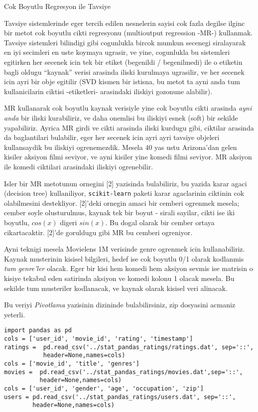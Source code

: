 \documentclass[12pt,fleqn]{article}\usepackage{../common}
\begin{document}
Cok Boyutlu Regresyon ile Tavsiye

Tavsiye sistemlerinde eger tercih edilen nesnelerin sayisi cok fazla
degilse ilginc bir metot cok boyutlu cikti regresyonu (multioutput
regression -MR-) kullanmak. Tavsiye sistemleri bilindigi gibi cogunlukla
bircok mumkun secenegi siralayarak en iyi secimleri en uste koymaya
ugrasir, ve yine, cogunlukla bu sistemleri egitirken her secenek icin tek
bir etiket (begenildi / begenilmedi) ile o etiketin bagli oldugu ``kaynak''
verisi arasinda iliski kurulmaya ugrasilir, ve her secenek icin ayri bir
obje egitilir (SVD kismen bir istisna, bu metot ta ayni anda tum
kullanicilarin ciktisi -etiketleri- arasindaki iliskiyi gozonune alabilir).

MR kullanarak cok boyutlu kaynak verisiyle yine cok boyutlu cikti arasinda
{\em ayni anda} bir iliski kurabiliriz, ve daha onemlisi bu iliskiyi esnek
(soft) bir sekilde yapabiliriz. Ayrica MR girdi ve cikti arasinda iliski
kurdugu gibi, ciktilar arasinda da baglantilari bulabilir, eger her secenek
icin ayri ayri tavsiye objeleri kullansaydik bu iliskiyi
ogrenemezdik. Mesela 40 yas ustu Arizona'dan gelen kisiler aksiyon filmi
seviyor, ve ayni kisiler yine komedi filmi seviyor. MR aksiyon ile komedi
ciktilari arasindaki iliskiyi ogrenebilir.

Isler bir MR metotunun ornegini [2] yazisinda bulabiliriz, bu yazida karar
agaci (decision tree) kullaniliyor, \verb!scikit-learn! paketi karar
agaclarinin ciktinin cok olabilmesini destekliyor. [2]'deki ornegin amaci
bir cemberi ogrenmek mesela; cember soyle olusturulmus, kaynak tek bir
boyut - sirali sayilar, cikti ise iki boyutlu, $cos(x)$ digeri $sin(x)$. Bu
dogal olarak bir cember ortaya cikartacaktir. [2]'de goruldugu gibi MR bu
cemberi ogreniyor.

Ayni teknigi mesela Movielens 1M verisinde genre ogrenmek icin
kullanabiliriz. Kaynak musterinin kisisel bilgileri, hedef ise cok boyutlu
0/1 olarak kodlanmis {\em tum genre'ler} olacak. Eger bir kisi hem komedi
hem aksiyon sevmis ise matrisin o kisiye tekabul eden satirinda aksiyon ve
komedi kolonu 1 olacak mesela. Bu sekilde tum musteriler kodlanacak, ve
kaynak olarak kisisel veri alinacak. 

Bu veriyi {\em Pivotlama} yazisinin dizininde bulabilirsiniz, zip dosyasini
acmaniz yeterli. 

\begin{verbatim}
import pandas as pd
cols = ['user_id', 'movie_id', 'rating', 'timestamp']
ratings =  pd.read_csv('../stat_pandas_ratings/ratings.dat', sep='::',
           header=None,names=cols)
cols = ['movie_id', 'title', 'genres']
movies =  pd.read_csv('../stat_pandas_ratings/movies.dat',sep='::',
          header=None,names=cols)
cols = ['user_id', 'gender', 'age', 'occupation', 'zip']
users = pd.read_csv('../stat_pandas_ratings/users.dat', sep='::', 
        header=None,names=cols)
\end{verbatim}
\end{document}
